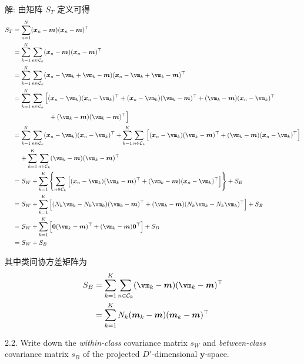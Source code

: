 \documentclass[openany]{ctexbook}
\theoremstyle{kaiti}
\theoremstyle{normal}
\begin{document}
解: 由矩阵 $S_T$ 定义可得
\begin{equation}
  \begin{aligned}
    S_{T}
    &=\sum_{n=1}^{N}(\bm{x}_{n}-\bm{m})(\bm{x}_{n}-\bm{m})^{\top}\\
    &=\sum_{k=1}^K\sum_{n\in\mathcal{C}_k}(\bm{x}_{n}-\bm{m})(\bm{x}_{n}-\bm{m})^{\top}\\
    &=\sum_{k=1}^K\sum_{n\in\mathcal{C}_k}(\bm{x}_{n}-\vm_k+\vm_k-\bm{m})(\bm{x}_{n}-\vm_k+\vm_k-\bm{m})^{\top}\\
    &=\sum_{k=1}^K\sum_{n\in\mathcal{C}_k}\Big[(\bm{x}_{n}-\vm_k)(\bm{x}_{n}-\vm_k)^{\top}+(\bm{x}_{n}-\vm_k)(\vm_k-\bm{m})^{\top}+(\vm_k-\bm{m})(\bm{x}_{n}-\vm_k)^{\top}\\
    &\hspace{20mm}+(\vm_k-\bm{m})(\vm_k-\bm{m})^{\top}\Big]\\
    &=\sum_{k=1}^K\sum_{n\in\mathcal{C}_k}(\bm{x}_{n}-\vm_k)(\bm{x}_{n}-\vm_k)^{\top}+\sum_{k=1}^K\sum_{n\in\mathcal{C}_k}\Big[(\bm{x}_{n}-\vm_k)(\vm_k-\bm{m})^{\top}+(\vm_k-\bm{m})(\bm{x}_{n}-\vm_k)^{\top}\Big]\\
    &\hspace{4mm}+\sum_{k=1}^K\sum_{n\in\mathcal{C}_k}(\vm_k-\bm{m})(\vm_k-\bm{m})^{\top}\\
    &=S_W+\sum_{k=1}^K\left\{\sum_{n\in\mathcal{C}_k}\Big[(\bm{x}_{n}-\vm_k)(\vm_k-\bm{m})^{\top}+(\vm_k-\bm{m})(\bm{x}_{n}-\vm_k)^{\top}\Big]\right\}+S_B\\
    &=S_W+\sum_{k=1}^K\Big[(N_k\vm_k-N_k\vm_k)(\vm_k-\bm{m})^{\top}+(\vm_k-\bm{m})(N_k\vm_k-N_k\vm_k)^{\top}\Big]+S_B\\
    &=S_W+\sum_{k=1}^K\Big[\bm{0}(\vm_k-\bm{m})^{\top}+(\vm_k-\bm{m})\bm{0}^{\top}\Big]+S_B\\
    &=S_W+S_B\\
  \end{aligned}
\end{equation}

其中类间协方差矩阵为
\begin{equation}
  \begin{aligned}
    S_{B}
    &=\sum_{k=1}^K\sum_{n\in\mathcal{C}_k}(\vm_k-\bm{m})(\vm_k-\bm{m})^{\top}\\
    &=\sum_{k=1}^{K}N_{k}(\bm{m}_{k}-\bm{m})(\bm{m}_{k}-\bm{m})^{\top}\\
  \end{aligned}
\end{equation}

2.2. Write down the \emph{within-class} covariance matrix $s_{W}$ and \emph{between-class} covariance matrix $s_{B}$ of the projected $D'$-dimensional $\bm{y}$-space.
\end{document}
